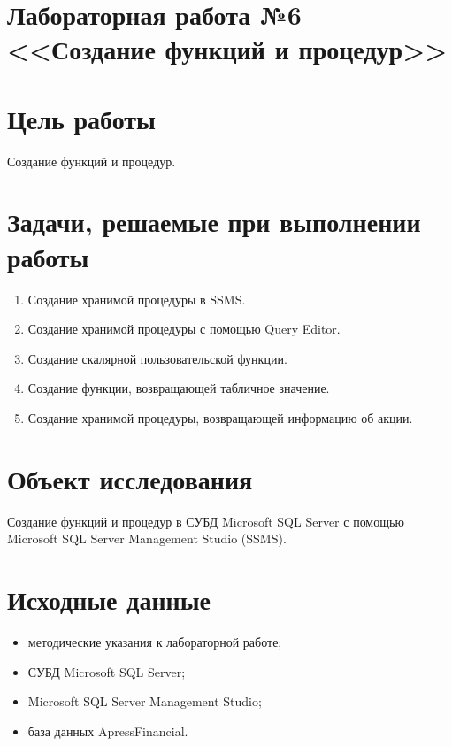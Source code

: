 \documentclass[a4paper, 14pt]{extarticle}
\begin{document}
\setcounter{page}{2}

\linespread{1.5}
\renewcommand{\baselinestretch}{1.5}

\section*{\large{Лабораторная работа №6 <<Создание функций и процедур>>}}

\section{Цель работы}

Создание функций и процедур.

\section{Задачи, решаемые при выполнении работы}

\begin{enumerate}[leftmargin=*]
  \item Создание хранимой процедуры в SSMS.
  \item Создание хранимой процедуры с помощью Query Editor.
  \item Создание скалярной пользовательской функции.
  \item Создание функции, возвращающей табличное значение.
  \item Создание хранимой процедуры, возвращающей информацию об акции.
\end{enumerate}

\section{Объект исследования}

Создание функций и процедур в СУБД \foreignlanguage{english}{Microsoft SQL
  Server} с помощью \foreignlanguage{english}{Microsoft SQL Server Management
  Studio (SSMS)}.

\section{Исходные данные}

\begin{itemize}
  \item методические указания к лабораторной работе;
  \item СУБД Microsoft SQL Server;
  \item Microsoft SQL Server Management Studio;
  \item база данных ApressFinancial.
\end{itemize}
\end{document}
